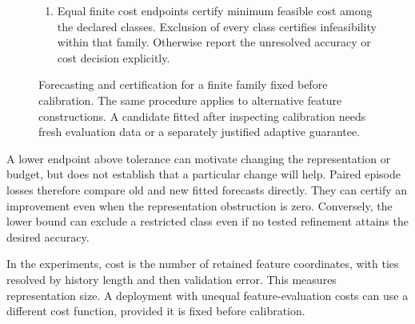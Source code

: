 \begin{figure}[t]
{\begin{minipage}{0.94\linewidth}
\begin{enumerate}[leftmargin=*,itemsep=3pt]
nonexcluded class and the cheapest accepted fit.
\item Equal finite cost endpoints certify minimum feasible cost among the
declared classes. Exclusion of every class certifies infeasibility within that
family. Otherwise report the unresolved accuracy or cost decision explicitly.
\end{enumerate}
\end{minipage}}
\caption{Forecasting and certification for a finite family fixed before calibration.
The same procedure applies to alternative feature constructions. A candidate
fitted after inspecting calibration needs fresh evaluation data or a separately
justified adaptive guarantee.}
\label{alg:procedure}
\end{figure}

A lower endpoint above tolerance can motivate changing the representation or
budget, but does not establish that a particular change will help. Paired
episode losses therefore compare old and new fitted forecasts directly. They
can certify an improvement even when the representation obstruction is zero.
Conversely, the lower bound can exclude a restricted class even if no tested
refinement attains the desired accuracy.

In the experiments, cost is the number of retained feature coordinates, with
ties resolved by history length and then validation error. This measures
representation size. A deployment with unequal feature-evaluation costs can
use a different cost function, provided it is fixed before calibration.
